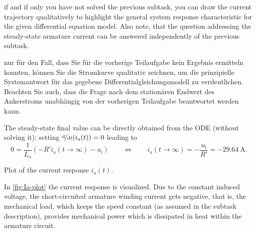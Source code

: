 \begin{hintblock}
    if and if only you have not solved the previous subtask, you can draw the current trajectory qualitatively to highlight the general system response characteristic for the given differential equation model. Also note, that the question addressing the steady-state armature current can be answered independently of the previous subtask.
\end{hintblock}
\begin{germanhintblock}
    nur für den Fall, dass Sie für die vorherige Teilaufgabe kein Ergebnis ermitteln konnten, können Sie die Stromkurve qualitativ zeichnen, um die prinzipielle Systemantwort für das gegebene Differentialgleichungsmodell zu verdeutlichen. Beachten Sie auch, dass die Frage nach dem stationären Endwert des Ankerstroms unabhängig von der vorherigen Teilaufgabe beantwortet werden kann.
\end{germanhintblock}

\begin{solutionblock}
    The steady-state final value can be directly obtained from the ODE (without solving it): setting $\nicefrac{\mathrm{d}}{\mathrm{d}t}(i_\mathrm{a}(t))=0$ leading to
    $$
        0 = \frac{1}{L_\mathrm{a}}\left(- R' i_\mathrm{a}(t\rightarrow\infty) - u_\mathrm{i}  \right) \qquad 
        \Leftrightarrow \qquad  i_\mathrm{a}(t\rightarrow\infty) = - \frac{u_\mathrm{i}}{R'} = \SI{-29.64}{\ampere}. 
    $$
    \begin{solutionfigure}[ht]
    \centering
    \caption{Plot of the current response $i_\mathrm{a}(t)$.}
    \label{fig:Ia-plot}
\end{solutionfigure}

  In \autoref{fig:Ia-plot} the current response is visualized. Due to the constant induced voltage, the short-circuited armature winding current gets negative, that is, the mechanical load, which keeps the speed constant (as assumed in the subtask description), provides mechanical power which is dissipated in heat within the armature circuit.    
\end{solutionblock}